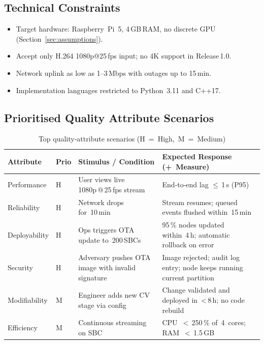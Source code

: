 \documentclass[11pt,a4paper]{article}
\begin{document}
\subsection{Technical Constraints}
\begin{itemize}
  \item Target hardware: Raspberry Pi 5, 4 GB RAM, no discrete GPU (Section \ref{sec:assumptions}).
  \item Accept only H.264 1080p@25 fps input; no 4K support in Release 1.0.
  \item Network uplink as low as 1–3 Mbps with outages up to 15 min.
  \item Implementation languages restricted to Python 3.11 and C++17.
\end{itemize}

\subsection{Prioritised Quality Attribute Scenarios}
\begin{table}[H]
\centering
\setlength{\extrarowheight}{2pt}
\begin{tabular}{|p{2.1cm}|p{0.8cm}|p{5.3cm}|p{4.9cm}|}
\hline
\textbf{Attribute} & \textbf{Prio} & \textbf{Stimulus / Condition} & \textbf{Expected Response (+ Measure)} \\ \hline
Performance   & H & User views live 1080p @ 25 fps stream & End‑to‑end lag $\le$ 1 s (P95) \\ \hline
Reliability   & H & Network drops for 10 min & Stream resumes; queued events flushed within 15 min \\ \hline
Deployability & H & Ops triggers OTA update to 200 SBCs & 95 \% nodes updated within 4 h; automatic rollback on error \\ \hline
Security      & H & Adversary pushes OTA image with invalid signature & Image rejected; audit log entry; node keeps running current partition \\ \hline
Modifiability & M & Engineer adds new CV stage via config & Change validated and deployed in < 8 h; no code rebuild \\ \hline
Efficiency    & M & Continuous streaming on SBC & CPU $<$ 250 \% of 4 cores; RAM $<$ 1.5 GB \\ \hline
\end{tabular}
\caption{Top quality‑attribute scenarios (H = High, M = Medium)}
\label{tab:qa_scenarios}
\end{table}
\end{document}

